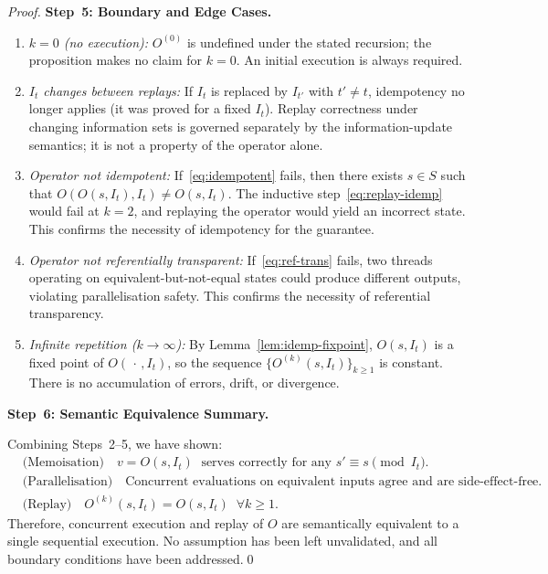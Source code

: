 \documentclass[12pt,openany]{book}
\newcommand{\calI}{\mathcal{I}}
\numberwithin{equation}{chapter}
\theoremstyle{plain}
\theoremstyle{definition}
\theoremstyle{remark}
\numberwithin{equation}{chapter}
\theoremstyle{plain}
\newcommand{\calS}{\mathcal{S}}
\def\calI{I}%
\def\calS{S}%
\begin{document}
\begin{proof}
\medskip
\noindent\textbf{Step~5: Boundary and Edge Cases.}

\begin{enumerate}
  \item \emph{$k = 0$ (no execution):}
        $O^{(0)}$ is undefined under the stated recursion; the
        proposition makes no claim for $k = 0$.  An initial execution
        is always required.

  \item \emph{$\calI_t$ changes between replays:}
        If $\calI_t$ is replaced by $\calI_{t'}$ with $t' \neq t$,
        idempotency no longer applies (it was proved for a fixed
        $\calI_t$).  Replay correctness under changing information
        sets is governed separately by the information-update
        semantics; it is not a property of the operator alone.

  \item \emph{Operator not idempotent:}
        If~\eqref{eq:idempotent} fails, then there exists $s \in \calS$
        such that $O(O(s, \calI_t), \calI_t) \neq O(s, \calI_t)$.
        The inductive step~\eqref{eq:replay-idemp} would fail at $k = 2$,
        and replaying the operator would yield an incorrect state.
        This confirms the necessity of idempotency for the guarantee.

  \item \emph{Operator not referentially transparent:}
        If~\eqref{eq:ref-trans} fails, two threads operating on
        equivalent-but-not-equal states could produce different outputs,
        violating parallelisation safety.  This confirms the necessity
        of referential transparency.

  \item \emph{Infinite repetition ($k \to \infty$):}
        By Lemma~\ref{lem:idemp-fixpoint}, $O(s, \calI_t)$ is a
        fixed point of $O(\,\cdot\,,\calI_t)$, so the sequence
        $\{O^{(k)}(s, \calI_t)\}_{k \geq 1}$ is constant.  There is
        no accumulation of errors, drift, or divergence.
\end{enumerate}

\medskip
\noindent\textbf{Step~6: Semantic Equivalence Summary.}

Combining Steps~2--5, we have shown:
\begin{align}
  &\text{(Memoisation)}\quad
    v = O(s, \calI_t)
    \;\text{ serves correctly for any }
    s' \equiv s \pmod{\calI_t}.
    \label{eq:summary-memo} \\[4pt]
  &\text{(Parallelisation)}\quad
    \text{Concurrent evaluations on equivalent inputs agree and
    are side-effect-free.}
    \label{eq:summary-parallel} \\[4pt]
  &\text{(Replay)}\quad
    O^{(k)}(s, \calI_t) = O(s, \calI_t)
    \;\;\forall k \geq 1.
    \label{eq:summary-replay}
\end{align}
Therefore, concurrent execution and replay of $O$ are
semantically equivalent to a single sequential execution.  No
assumption has been left unvalidated, and all boundary conditions have
been addressed.\qed
\end{proof}
\end{document}
